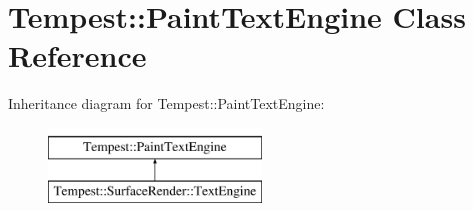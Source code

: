 \hypertarget{class_tempest_1_1_paint_text_engine}{\section{Tempest\+:\+:Paint\+Text\+Engine Class Reference}
\label{class_tempest_1_1_paint_text_engine}
}
Inheritance diagram for Tempest\+:\+:Paint\+Text\+Engine\+:\begin{figure}[H]
\begin{center}
\leavevmode
\includegraphics[height=2.000000cm]{class_tempest_1_1_paint_text_engine}
\end{center}
\end{figure}
